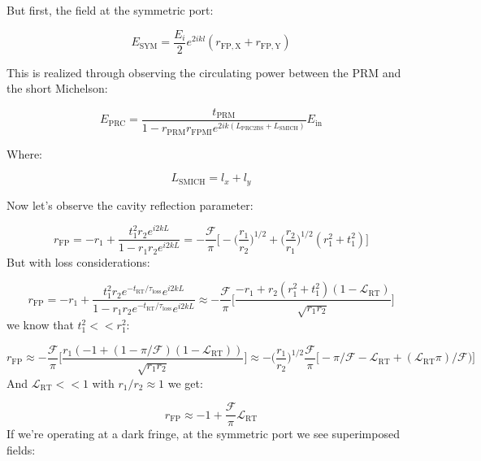 But first, the field at the symmetric port:

\begin{equation}E_\mathrm{SYM} = \frac{E_i}{2}e^{2ikl}(r_\mathrm{FP,X} + r_\mathrm{FP,Y}) \end{equation}

This is realized through observing the circulating power between the PRM
and the short Michelson:

\begin{equation} E_\mathrm{PRC} = \frac{t_\mathrm{PRM}}{1- r_\mathrm{PRM} r_\mathrm{FPMI} e^{2ik (L_\mathrm{PRC2BS} + L_\mathrm{SMICH})}}E_\mathrm{in} \end{equation}

Where:

\begin{equation} L_\mathrm{SMICH} = l_x + l_y \end{equation}

Now let's observe the cavity reflection parameter:

\begin{equation} r_\mathrm{FP} = -r_1 + \frac{t_1^2 r_2 e^{i2kL}}{1-r_1 r_2 e^{i2kL}} = -\frac{\mathcal{F}}{\pi} \Big[-\Big(\frac{r_1}{r_2} \Big)^{1/2} + \Big(\frac{r_2}{r_1}\Big)^{1/2} (r_1^2 + t_1^2) \Big]\end{equation}
But with loss considerations:

\begin{equation} r_\mathrm{FP} = -r_1 + \frac{t_1^2 r_2 e^{- t_\mathrm{RT}/\tau_\mathrm{loss}}  e^{i2kL}}{1-r_1 r_2 e^{- t_\mathrm{RT}/\tau_\mathrm{loss}} e^{i2kL}} \approx -\frac{\mathcal{F}}{\pi} \Big[\frac{-r_1 +  r_2(r_1^2 + t_1^2)(1-\mathscr{L}_\mathrm{RT})}{\sqrt{r_1 r_2}} \Big]\end{equation}
we know that \(t_1^2 << r_1^2\):

\begin{equation}r_\mathrm{FP} \approx -\frac{\mathcal{F}}{\pi} \Big[ \frac{r_1(-1 + (1 - \pi/\mathcal{F}) (1- \mathscr{L}_\mathrm{RT}))}{\sqrt{r_1 r_2}} \Big] \approx  -\Big(\frac{r_1}{r_2}\Big)^{1/2} \frac{\mathcal{F}}{\pi} \Big[- \pi/\mathcal{F} - \mathscr{L}_\mathrm{RT} + (\mathscr{L}_\mathrm{RT}\pi)/\mathcal{F}) \Big] \end{equation}And
\(\mathscr{L}_\mathrm{RT} <<1\) with \(r_1 /r_2 \approx 1\) we get:

\begin{equation}r_\mathrm{FP} \approx -1 + \frac{\mathcal{F}}{\pi} \mathscr{L}_\mathrm{RT}\end{equation}If
we're operating at a dark fringe, at the symmetric port we see
superimposed fields:

